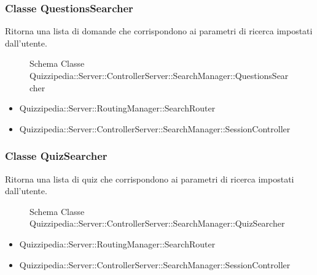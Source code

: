 \subsubsection{Classe QuestionsSearcher}
Ritorna una lista di domande che corrispondono ai parametri di ricerca impostati dall'utente.
\begin{figure}[H]
\centering
\noindent{}
\caption{Schema Classe Quizzipedia::Server::ControllerServer::SearchManager::QuestionsSearcher}
\end{figure}
\begin{itemize}
\item Quizzipedia::Server::RoutingManager::SearchRouter
\end{itemize}
\begin{itemize}
\item Quizzipedia::Server::ControllerServer::SearchManager::SessionController
\end{itemize}
\subsubsection{Classe QuizSearcher}
Ritorna una lista di quiz che corrispondono ai parametri di ricerca impostati dall'utente.
\begin{figure}[H]
\centering
\noindent{}
\caption{Schema Classe Quizzipedia::Server::ControllerServer::SearchManager::QuizSearcher}
\end{figure}
\begin{itemize}
\item Quizzipedia::Server::RoutingManager::SearchRouter
\end{itemize}
\begin{itemize}
\item Quizzipedia::Server::ControllerServer::SearchManager::SessionController
\end{itemize}
